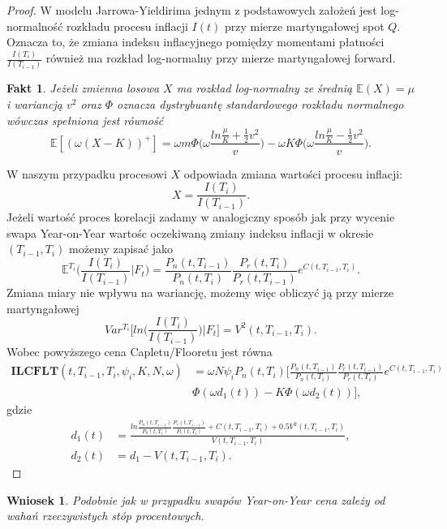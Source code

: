 \documentclass{mini}
\theoremstyle{mythstyle}
\newtheorem{Fakt}{Fakt}[chapter]
\newtheorem{Wniosek}{Wniosek}[chapter]
\begin{document}
\begin{proof}
	W modelu Jarrowa-Yieldirima jednym z podstawowych założeń jest log-normalność rozkładu procesu inflacji $I(t)$ przy mierze martyngałowej spot $Q$. Oznacza to, że zmiana indeksu inflacyjnego pomiędzy momentami płatności $\frac{I(T_i)}{I(T_{i-1})}$ również ma rozkład log-normalny przy mierze martyngałowej forward.\\
	\begin{Fakt}
		Jeżeli zmienna losowa $X$ ma rozkład log-normalny ze średnią $\mathbb{E}(X) = \mu$ i wariancją $v^2$ oraz $\Phi$ oznacza dystrybuantę standardowego rozkładu normalnego wówczas spełniona jest równość
		\begin{equation}
		\mathbb{E}[(\omega(X - K))^+] = \omega m \Phi\bigg( \omega \frac{ln\frac{\mu}{K} + \frac{1}{2}v^2}{v}\bigg) - \omega K\Phi\bigg( \omega \frac{ln\frac{\mu}{K} - \frac{1}{2}v^2}{v}\bigg).
		\end{equation} 
	\end{Fakt}
	W naszym przypadku procesowi $X$ odpowiada zmiana wartości procesu inflacji: $$X = \frac{I(T_i)}{I(T_{i-1})}.$$ Jeżeli wartość proces korelacji zadamy w analogiczny sposób jak przy wycenie swapa Year-on-Year wartośc oczekiwaną zmiany indeksu inflacji w okresie $(T_{i-1},T_i)$ możemy zapisać jako
	\begin{equation}
	\mathbb{E}^{T_i} \bigg(	\frac{I(T_i)}{I(T_{i-1})} \bigg|F_t\bigg) = \frac{P_n(t,T_{i-1})}{P_n(t,T_i)} \frac{P_r(t,T_i)}{P_r(t,T_{i-1})} e^{C(t,T_{i-1},T_i)}. 
	\end{equation}
	Zmiana miary nie wpływu na wariancję, możemy więc obliczyć ją przy mierze martyngałowej
	\begin{equation}
	Var^{T_i} \bigg[ ln\bigg(\frac{I(T_i)}{I(T_{i-1})}\bigg)\bigg|F_t\bigg] = V^2(t,T_{i-1},T_i).
	\end{equation}	
	Wobec powyższego cena Capletu/Flooretu jest równa
	\begin{align*}
	\mathbf{ILCFLT}(t,T_{i-1},T_i,\psi_i,K,N,\omega) &= \omega N\psi_iP_n(t,T_i)\bigg[ \frac{P_n(t,T_{i-1})}{P_n(t,T_i)} \frac{P_r(t,T_{i-1})}{P_r(t,T_i)} e^{C(t,T_{i-1},T_i)} \\ &\Phi(\omega d_1(t)) - K\Phi(\omega d_2(t))\bigg],
	\end{align*}
	gdzie
	\begin{align*}
	d_1(t) &= \frac{ln \frac{P_n(t,T_{i-1})}{P_n(t,T_i)} \frac{P_r(t,T_{i-1})}{P_r(t,T_i)} + C(t,T_{i-1},T_i) + 0.5 V^2(t,T_{i-1},T_i)}{V(t,T_{i-1},T_i)},\\
	d_2(t)&= d_1 - V(t,T_{i-1},T_i).
	\end{align*}
\end{proof}
	\begin{Wniosek}
		Podobnie jak w przypadku swapów Year-on-Year cena zależy od wahań rzeczywistych stóp procentowych.
	\end{Wniosek}
\pagebreak
\end{document}
